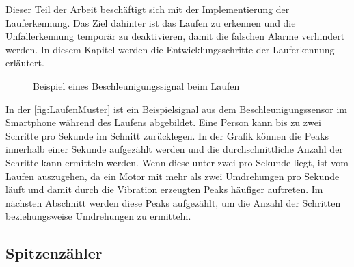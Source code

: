 Dieser Teil der Arbeit beschäftigt sich mit der Implementierung der Lauferkennung. Das Ziel dahinter ist das Laufen zu erkennen und die Unfallerkennung temporär zu deaktivieren, damit die falschen Alarme verhindert werden.
In diesem Kapitel werden die Entwicklungsschritte der Lauferkennung erläutert.

%

\begin{figure}[htpb]
	\centering
	\caption{Beispiel eines Beschleunigungssignal beim Laufen}
	\label{fig:LaufenMuster}
\end{figure}
In der \autoref{fig:LaufenMuster} ist ein Beispielsignal aus dem Beschleunigungssensor im Smartphone während des Laufens abgebildet. Eine Person kann bis zu zwei Schritte pro Sekunde im Schnitt zurücklegen. In der Grafik können die Peaks innerhalb einer Sekunde aufgezählt werden und die durchschnittliche Anzahl der Schritte kann ermitteln werden. Wenn diese unter zwei pro Sekunde liegt, ist vom Laufen auszugehen, da ein Motor mit mehr als zwei Umdrehungen pro Sekunde läuft und damit durch die Vibration erzeugten Peaks häufiger auftreten. Im nächsten Abschnitt werden diese Peaks aufgezählt, um die Anzahl der Schritten beziehungsweise Umdrehungen zu ermitteln.
%
\subsection{Spitzenzähler} \label{abs:PeaksAufzaehlen} %

